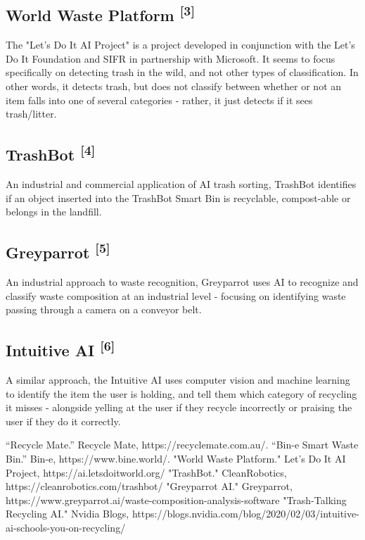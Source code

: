 \documentclass[conference]{IEEEtran}
\begin{document}
\subsection{World Waste Platform \textsuperscript{[3]}}

The "Let's Do It AI Project" is a project developed in conjunction with the Let's Do It Foundation and SIFR in partnership with Microsoft.
\newline
It seems to focus specifically on detecting trash in the wild, and not other types of classification. In other words, it detects trash, but does not classify between whether or not an item falls into one of several categories - rather, it just detects if it sees trash/litter.

\subsection{TrashBot \textsuperscript{[4]}}

An industrial and commercial application of AI trash sorting, TrashBot identifies if an object inserted into the TrashBot Smart Bin is recyclable, compost-able or belongs in the landfill. 

\subsection{Greyparrot \textsuperscript{[5]}}

An industrial approach to waste recognition, Greyparrot uses AI to recognize and classify waste composition at an industrial level - focusing on identifying waste passing through a camera on a conveyor belt.

\subsection{Intuitive AI \textsuperscript{[6]}}

A similar approach, the Intuitive AI uses computer vision and machine learning to identify the item the user is holding, and tell them which category of recycling it misses - alongside yelling at the user if they recycle incorrectly or praising the user if they do it correctly.
  
\begin{thebibliography}{00}
 “Recycle Mate.” Recycle Mate, https://recyclemate.com.au/. 
 “Bin-e Smart Waste Bin.” Bin-e, https://www.bine.world/. 
 "World Waste Platform." Let's Do It AI Project, https://ai.letsdoitworld.org/
 "TrashBot." CleanRobotics, https://cleanrobotics.com/trashbot/
 "Greyparrot AI." Greyparrot, https://www.greyparrot.ai/waste-composition-analysis-software
 "Trash-Talking Recycling AI." Nvidia Blogs, https://blogs.nvidia.com/blog/2020/02/03/intuitive-ai-schools-you-on-recycling/
\end{thebibliography}
\end{document}
